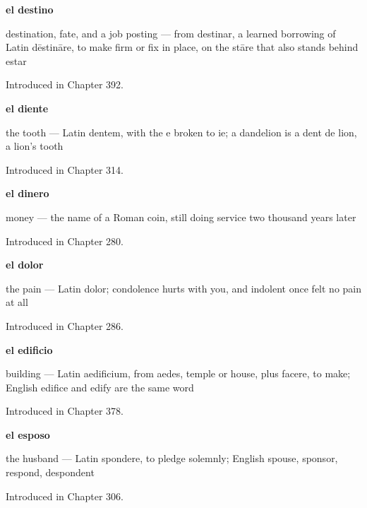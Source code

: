 \noindent\begin{minipage}[t]{\linewidth}
\raggedright
\textbf{el destino}\par
\small destination, fate, and a job posting — from destinar, a learned borrowing of Latin dēstināre, to make firm or fix in place, on the stāre that also stands behind estar\par
\footnotesize Introduced in Chapter 392.
\end{minipage}\par\medskip

\noindent\begin{minipage}[t]{\linewidth}
\raggedright
\textbf{el diente}\par
\small the tooth — Latin dentem, with the e broken to ie; a dandelion is a dent de lion, a lion's tooth\par
\footnotesize Introduced in Chapter 314.
\end{minipage}\par\medskip

\noindent\begin{minipage}[t]{\linewidth}
\raggedright
\textbf{el dinero}\par
\small money — the name of a Roman coin, still doing service two thousand years later\par
\footnotesize Introduced in Chapter 280.
\end{minipage}\par\medskip

\noindent\begin{minipage}[t]{\linewidth}
\raggedright
\textbf{el dolor}\par
\small the pain — Latin dolor; condolence hurts with you, and indolent once felt no pain at all\par
\footnotesize Introduced in Chapter 286.
\end{minipage}\par\medskip

\noindent\begin{minipage}[t]{\linewidth}
\raggedright
\textbf{el edificio}\par
\small building — Latin aedificium, from aedes, temple or house, plus facere, to make; English edifice and edify are the same word\par
\footnotesize Introduced in Chapter 378.
\end{minipage}\par\medskip

\noindent\begin{minipage}[t]{\linewidth}
\raggedright
\textbf{el esposo}\par
\small the husband --- Latin spondere, to pledge solemnly; English spouse, sponsor, respond, despondent\par
\footnotesize Introduced in Chapter 306.
\end{minipage}\par\medskip

